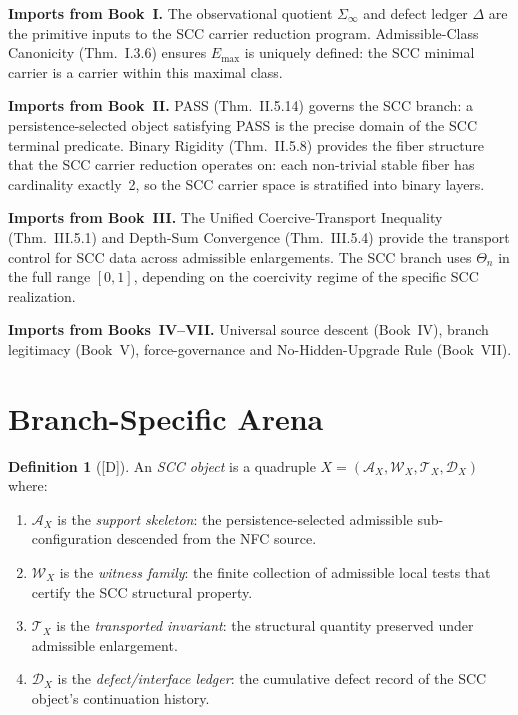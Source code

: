 \documentclass[12pt,oneside]{amsbook}
\theoremstyle{plain}
\theoremstyle{definition}
\newtheorem{definition}[theorem]{Definition}
\theoremstyle{remark}
\newcommand{\status}[1]{\textup{[#1]}}
\begin{document}
\textbf{Imports from Book~I.} The observational quotient
$\Sigma_\infty$ and defect ledger $\Delta$ are the primitive
inputs to the SCC carrier reduction program. Admissible-Class
Canonicity (Thm.~I.3.6) ensures $E_{\max}$ is uniquely defined:
the SCC minimal carrier is a carrier within this maximal class.

\textbf{Imports from Book~II.} PASS (Thm.~II.5.14) governs
the SCC branch: a persistence-selected object satisfying PASS is
the precise domain of the SCC terminal predicate. Binary Rigidity
(Thm.~II.5.8) provides the fiber structure that the SCC carrier
reduction operates on: each non-trivial stable fiber has
cardinality exactly~2, so the SCC carrier space is stratified
into binary layers.

\textbf{Imports from Book~III.} The Unified
Coercive-Transport Inequality (Thm.~III.5.1) and Depth-Sum
Convergence (Thm.~III.5.4) provide the transport control for
SCC data across admissible enlargements. The SCC branch uses
$\Theta_n$ in the full range $[0,1]$, depending on the
coercivity regime of the specific SCC realization.

\textbf{Imports from Books~IV--VII.} Universal source descent
(Book~IV), branch legitimacy (Book~V), force-governance and
No-Hidden-Upgrade Rule (Book~VII).

\section{Branch-Specific Arena}
\label{sec:arena}

\begin{definition}[\status{D}]\label{def:scc-object}
An \emph{SCC object} is a quadruple
$X = (\mathcal{A}_X, \mathcal{W}_X, \mathcal{T}_X, \mathcal{D}_X)$
where:
\begin{enumerate}[label=\textup{(\arabic*)}]
 \item $\mathcal{A}_X$ is the \emph{support skeleton}: the
 persistence-selected admissible sub-configuration
 descended from the NFC source.
 \item $\mathcal{W}_X$ is the \emph{witness family}: the
 finite collection of admissible local tests that
 certify the SCC structural property.
 \item $\mathcal{T}_X$ is the \emph{transported invariant}:
 the structural quantity preserved under admissible
 enlargement.
 \item $\mathcal{D}_X$ is the \emph{defect/interface ledger}:
 the cumulative defect record of the SCC object's
 continuation history.
\end{enumerate}
\end{definition}
\end{document}
